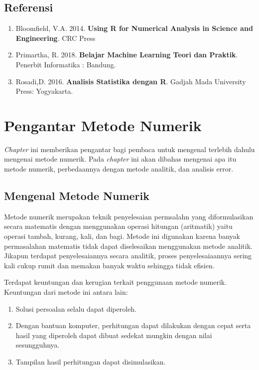 \documentclass[]{book}
\providecommand{\tightlist}{%
  \setlength{\itemsep}{0pt}\setlength{\parskip}{0pt}}
\theoremstyle{definition}
\theoremstyle{definition}
\theoremstyle{definition}
\theoremstyle{remark}
\begin{document}
\hypertarget{referensi-3}{%
\section{Referensi}\label{referensi-3}}

\begin{enumerate}
\def\labelenumi{\arabic{enumi}.}
\tightlist
\item
  Bloomfield, V.A. 2014. \textbf{Using R for Numerical Analysis in Science and Engineering}. CRC Press
\item
  Primartha, R. 2018. \textbf{Belajar Machine Learning Teori dan Praktik}. Penerbit Informatika : Bandung.
\item
  Rosadi,D. 2016. \textbf{Analisis Statistika dengan R}. Gadjah Mada University Press: Yogyakarta.
\end{enumerate}

\hypertarget{numericmethod}{%
\chapter{Pengantar Metode Numerik}\label{numericmethod}}

\emph{Chapter} ini memberikan pengantar bagi pembaca untuk mengenal terlebih dahulu mengenai metode numerik. Pada \emph{chapter} ini akan dibahas mengenai apa itu metode numerik, perbedaannya dengan metode analitik, dan analisis error.

\hypertarget{numericmethodintro}{%
\section{Mengenal Metode Numerik}\label{numericmethodintro}}

Metode numerik merupakan teknik penyelesaian permsalahn yang diformulasikan secara matematis dengan menggunakan operasi hitungan (aritmatik) yaitu operasi tambah, kurang, kali, dan bagi. Metode ini digunakan karena banyak permasalahan matematis tidak dapat diselesaikan menggunakan metode analitik. Jikapun terdapat penyelesaiannya secara analitik, proses penyelesaiaannya sering kali cukup rumit dan memakan banyak waktu sehingga tidak efisien.

Terdapat keuntungan dan kerugian terkait penggunaan metode numerik. Keuntungan dari metode ini antara lain:

\begin{enumerate}
\def\labelenumi{\arabic{enumi}.}
\tightlist
\item
  Solusi persoalan selalu dapat diperoleh.
\item
  Dengan bantuan komputer, perhitungan dapat dilakukan dengan cepat serta hasil yang diperoleh dapat dibuat sedekat mungkin dengan nilai sesungguhnya.
\item
  Tampilan hasil perhitungan dapat disimulasikan.
\end{enumerate}
\end{document}
